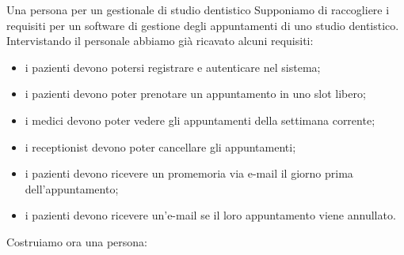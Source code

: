 \begin{esempio}{Una persona per un gestionale di studio dentistico}
Supponiamo di raccogliere i requisiti per un software di gestione degli appuntamenti di uno studio dentistico.
Intervistando il personale abbiamo già ricavato alcuni requisiti:
\begin{itemize}\itemsep1pt
  \item i pazienti devono potersi registrare e autenticare nel sistema;
  \item i pazienti devono poter prenotare un appuntamento in uno slot libero;
  \item i medici devono poter vedere gli appuntamenti della settimana corrente;
  \item i receptionist devono poter cancellare gli appuntamenti;
  \item i pazienti devono ricevere un promemoria via e-mail il giorno prima dell'appuntamento;
  \item i pazienti devono ricevere un'e-mail se il loro appuntamento viene annullato.
\end{itemize}

Costruiamo ora una persona:


\end{esempio}
